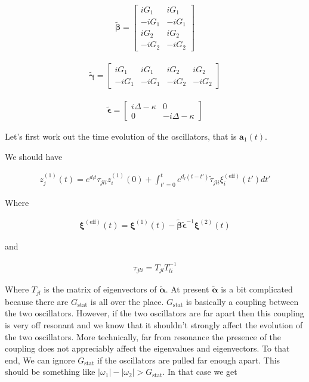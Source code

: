 \documentclass[12pt]{article}
\newcommand{\bv}[1]{\boldsymbol{#1}}
\begin{document}
\begin{align}
\tilde{\bv{\beta}} = 
\begin{bmatrix}
iG_1 & iG_1\\
-iG_1 & -i G_1\\
iG_2 & iG_2\\
-iG_2 & -iG_2
\end{bmatrix}
\end{align}

\begin{align}
\tilde{\bv{\gamma}} = 
\begin{bmatrix}
iG_1 & iG_1 & iG_2 & iG_2\\
-iG_1 & -iG_1 & -iG_2 & -iG_2
\end{bmatrix}
\end{align}

\begin{align}
\tilde{\bv{\epsilon}} = 
\begin{bmatrix}
i\Delta-\kappa & 0\\
0 & -i\Delta - \kappa
\end{bmatrix}
\end{align}

Let's first work out the time evolution of the oscillators, that is $\bv{a}_1(t)$.

We should have

\begin{align}
z^{(1)}_{j}(t) = e^{d_l t}\tau_{jli}z^{(1)}_{i}(0) + \int_{t'=0}^t e^{d_l(t-t')}\tilde{\tau}_{jli}\xi^{(\text{eff})}_{i}(t')dt'
\end{align}

Where

\begin{align}
\bv{\xi}^{(\text{eff})}(t) = \bv{\xi}^{(1)}(t) - \tilde{\bv{\beta}}\tilde{\bv{\epsilon}}^{-1}\bv{\xi}^{(2)}(t)
\end{align}

and

\begin{align}
\tau_{jli} = T_{jl}T^{-1}_{li}
\end{align}

Where $T_{jl}$ is the matrix of eigenvectors of $\tilde{\bv{\alpha}}$. At present $\tilde{\bv{\alpha}}$ is a bit complicated because there are $G_{\text{stat}}$ is all over the place. $G_{\text{stat}}$ is basically a coupling between the two oscillators. However, if the two oscillators are far apart then this coupling is very off resonant and we know that it shouldn't strongly affect the evolution of the two oscillators. More technically, far from resonance the presence of the coupling does not appreciably affect the eigenvalues and eigenvectors. To that end, We can ignore $G_{\text{stat}}$ if the oscillators are pulled far enough apart. This should be something like $|\omega_1|-|\omega_2| > G_{\text{stat}}$. In that case we get
\end{document}
